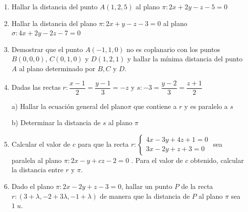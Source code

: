 \begin{enumerate}
\vspace{2mm} 	

\item Hallar la distancia del punto $A(1,2,5)$ al plano $\pi: 2x+2y-z-5=0$

\vspace{2mm} 	

\item Hallar la distancia del plano $\pi: 2x+y-z-3=0$ al plano $\sigma: 4x+2y-2z-7=0 $

\vspace{2mm} 	

\item Demostrar que el punto $A(-1,1,0)$ no es coplanario con los puntos $B(0,0,0)$, $C(0,1,0)$ y $D(1,2,1)$ y hallar la mínima distancia del punto $A$ al plano determinado por $B, C \text{ y } D$. 

\vspace{2mm} 	

\item Dadas las rectas $r:\dfrac {x-1}2=\dfrac{y-1}3=-z$ y $s:-3=\dfrac{y-2}{3}=\dfrac{z+1}{2}$

a) Hallar la ecuación general del plano$\pi$ que contiene a $r$ y es paralelo a $s$

b) Determinar la distancia de $s$ al plano $\pi$

\vspace{2mm} 	

\item Calcular el valor de $c$ para que la recta $r:\begin{cases}4x-3y+4z+1=0\\3x-2y+z+3=0\end{cases}$ sea paralela al plano $\pi: 2x-y+cz-2=0$ . Para el valor de $c$ obtenido, calcular la distancia entre $r$ y $\pi$. 

\vspace{2mm} 	

\item Dado el plano $\pi: 2x-2y+z-3=0$, hallar un punto $P$ de la recta $r: (3+\lambda,-2+3\lambda,-1+\lambda) $ de manera que la distancia de $P$ al plano $\pi$ sea $1\; u$. 


\end{enumerate}
